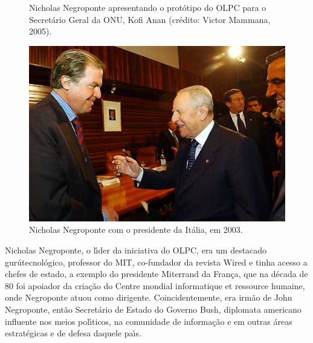 \documentclass[
12pt,		%
openright,	%
twoside,  %
a4paper,			%
chapter=TITLE,		%
english,			%
french,				%
spanish,			%
brazil				%
]{USPSC-classe/USPSC}
\begin{document}
\begin{figure}[max size={\textwidth}{\textheight}]
\begin{minipage}[b]{0.4\linewidth}
                \caption{Nicholas Negroponte apresentando o prot\'otipo do OLPC para o Secret\'ario Geral da ONU, Kofi Anan (cr\'edito: Victor Mammana, 2005).}
                \label{31f6206a8e4662597d5a134974d64a4696f4129c}
\end{minipage}
\hspace{0.5cm}
\begin{minipage}[b]{0.4\linewidth}
        \centering
                \includegraphics[width=1.0\linewidth]{../../imagens/presidente-italia.jpg}
                \caption{Nicholas Negroponte com o presidente da It\'alia, em 2003.}
                \label{f15f5d2fa7b78d2e6dec6ac4a7be76d564c9bf71}
\end{minipage}%
\hspace{0.5cm}
\end{figure}



Nicholas Negroponte, o l\'{\i}der da iniciativa do OLPC, era um destacado \textquotedbl gur\'u\textquotedbl  tecnol\'ogico, professor do MIT, co-fundador da revista Wired e tinha acesso a chefes de estado, a exemplo do presidente Miterrand da Fran\c{c}a, que na d\'ecada de 80 foi apoiador da cria\c{c}\~ao do \textquotedbl Centre mondial informatique et ressource humaine\textquotedbl , onde Negroponte atuou como dirigente. Coincidentemente, era irm\~ao de John Negroponte, ent\~ao Secret\'ario de Estado do Governo Bush, diplomata americano influente nos meios pol\'{\i}ticos, na comunidade de informa\c{c}\~ao e em outras \'areas estrat\'egicas e de defesa daquele pa\'{\i}s.
\end{document}

